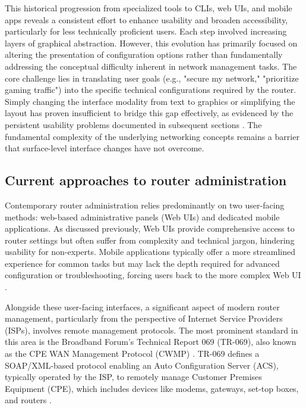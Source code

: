 This historical progression from specialized tools to CLIs, web UIs, and mobile apps reveals a consistent effort to enhance usability and broaden accessibility, particularly for less technically proficient users. Each step involved increasing layers of graphical abstraction. However, this evolution has primarily focused on altering the presentation of configuration options rather than fundamentally addressing the conceptual difficulty inherent in network management tasks. The core challenge lies in translating user goals (e.g., "secure my network," "prioritize gaming traffic") into the specific technical configurations required by the router. Simply changing the interface modality from text to graphics or simplifying the layout has proven insufficient to bridge this gap effectively, as evidenced by the persistent usability problems documented in subsequent sections \cite{home_network_challenges}. The fundamental complexity of the underlying networking concepts remains a barrier that surface-level interface changes have not overcome.

\subsection{Current approaches to router administration}
Contemporary router administration relies predominantly on two user-facing methods: web-based administrative panels (Web UIs) and dedicated mobile applications. As discussed previously, Web UIs provide comprehensive access to router settings but often suffer from complexity and technical jargon, hindering usability for non-experts. Mobile applications typically offer a more streamlined experience for common tasks but may lack the depth required for advanced configuration or troubleshooting, forcing users back to the more complex Web UI \cite{parental_controls_value}.

Alongside these user-facing interfaces, a significant aspect of modern router management, particularly from the perspective of Internet Service Providers (ISPs), involves remote management protocols. The most prominent standard in this area is the Broadband Forum's Technical Report 069 (TR-069), also known as the CPE WAN Management Protocol (CWMP) \cite{router_security_vulnerabilities}. TR-069 defines a SOAP/XML-based protocol enabling an Auto Configuration Server (ACS), typically operated by the ISP, to remotely manage Customer Premises Equipment (CPE), which includes devices like modems, gateways, set-top boxes, and routers \cite{router_security_vulnerabilities}.

